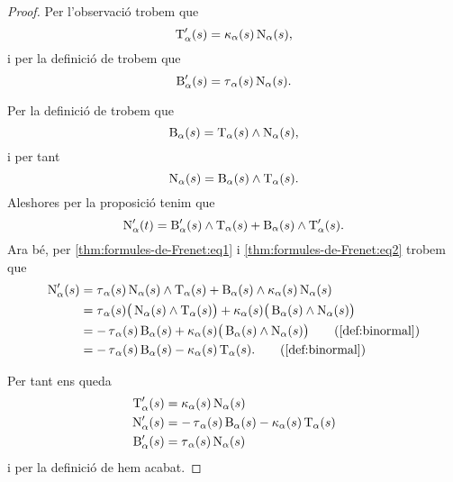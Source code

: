 \documentclass[../../main.tex]{subfiles}
\begin{document}
    \begin{proof}
        Per l'observació  trobem que
        \begin{equation}
            \label{thm:formules-de-Frenet:eq1}
            \operatorname{T}_{\alpha}'(s)=\operatorname{\kappa}_{\alpha}(s)\operatorname{N}_{\alpha}(s),
        \end{equation}
        i per la definició de  trobem que
        \begin{equation}
            \label{thm:formules-de-Frenet:eq2}
            \operatorname{B}'_{\alpha}(s)=\operatorname{\tau}_{\alpha}(s)\operatorname{N}_{\alpha}(s).
        \end{equation}

        Per la definició de  trobem que
        \[
            \operatorname{B}_{\alpha}(s)=\operatorname{T}_{\alpha}(s)\mathbin{\wedge}\operatorname{N}_{\alpha}(s),
        \]
        i per tant %
        \[
            \operatorname{N}_{\alpha}(s)=\operatorname{B}_{\alpha}(s)\mathbin{\wedge}\operatorname{T}_{\alpha}(s).
        \]
        Aleshores per la proposició  tenim que
        \[
            \operatorname{N}'_{\alpha}(t)=\operatorname{B}'_{\alpha}(s)\mathbin{\wedge}\operatorname{T}_{\alpha}(s)+\operatorname{B}_{\alpha}(s)\mathbin{\wedge}\operatorname{T}'_{\alpha}(s).
        \]
        Ara bé, per \eqref{thm:formules-de-Frenet:eq1} i \eqref{thm:formules-de-Frenet:eq2} trobem que
        \begin{align*}
            \normal'_{\alpha}(s)&=\torsio_{\alpha}(s)\normal_{\alpha}(s)\prodvec\tangent_{\alpha}(s)+\binormal_{\alpha}(s)\prodvec\curvatura_{\alpha}(s)\normal_{\alpha}(s) \\
            &=\torsio_{\alpha}(s)\big(\normal_{\alpha}(s)\prodvec\tangent_{\alpha}(s)\big)+\curvatura_{\alpha}(s)\big(\binormal_{\alpha}(s)\prodvec\normal_{\alpha}(s)\big) \\ %
            &=-\torsio_{\alpha}(s)\binormal_{\alpha}(s)+\curvatura_{\alpha}(s)\big(\binormal_{\alpha}(s)\prodvec\normal_{\alpha}(s)\big) \tag{\ref{def:binormal}} \\
            &=-\torsio_{\alpha}(s)\binormal_{\alpha}(s)-\curvatura_{\alpha}(s)\tangent_{\alpha}(s).
            \tag{\ref{def:binormal}}
        \end{align*}

        Per tant ens queda
        \begin{align*}
            \operatorname{T}_{\alpha}'(s)&=\operatorname{\kappa}_{\alpha}(s)\operatorname{N}_{\alpha}(s) \\
            \operatorname{N}'_{\alpha}(s)&=-\operatorname{\tau}_{\alpha}(s)\operatorname{B}_{\alpha}(s)-\operatorname{\kappa}_{\alpha}(s)\operatorname{T}_{\alpha}(s) \\
            \operatorname{B}'_{\alpha}(s)&=\operatorname{\tau}_{\alpha}(s)\operatorname{N}_{\alpha}(s)
        \end{align*}
        i per la definició de  hem acabat.
    \end{proof}
\end{document}
